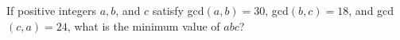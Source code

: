 If positive integers $a, b$, and $c$ satisfy gcd$(a, b) = 30$, gcd$(b, c) = 18$, and gcd$(c, a) = 24$, what is the minimum value of $abc$?
